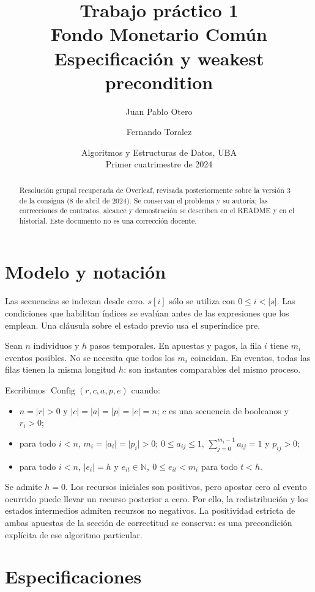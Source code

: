 \documentclass[11pt,a4paper]{article}
\title{Trabajo práctico 1\\Fondo Monetario Común\\Especificación y weakest precondition}
\author{Juan Pablo Otero \and Fernando Toralez}
\date{Algoritmos y Estructuras de Datos, UBA\\Primer cuatrimestre de 2024}
\newcommand{\N}{\mathbb N}
\newcommand{\len}[1]{\lvert #1\rvert}
\begin{document}
\maketitle
\begin{abstract}
Resolución grupal recuperada de Overleaf, revisada posteriormente sobre la
versión 3 de la consigna (8 de abril de 2024). Se conservan el problema y su
autoría; las correcciones de contratos, alcance y demostración se describen
en el README y en el historial. Este documento no es una corrección docente.
\end{abstract}
\tableofcontents
\clearpage
\section{Modelo y notación}
Las secuencias se indexan desde cero. $s[i]$ sólo se utiliza con
$0\leq i<\len{s}$. Las condiciones que habilitan índices se evalúan antes
de las expresiones que los emplean. Una cláusula sobre el estado previo
usa el superíndice $\mathrm{pre}$.

Sean $n$ individuos y $h$ pasos temporales. En apuestas y pagos, la fila
$i$ tiene $m_i$ eventos posibles. No se necesita que todos los $m_i$
coincidan. En eventos, todas las filas tienen la misma longitud $h$:
son instantes comparables del mismo proceso.

Escribimos $\operatorname{Config}(r,c,a,p,e)$ cuando:
\begin{itemize}
\item $n=\len{r}>0$ y $\len{c}=\len{a}=\len{p}=\len{e}=n$;
      $c$ es una secuencia de booleanos y $r_i>0$;
\item para todo $i<n$, $m_i=\len{a_i}=\len{p_i}>0$;
      $0\leq a_{ij}\leq1$, $\sum_{j=0}^{m_i-1}a_{ij}=1$ y $p_{ij}>0$;
\item para todo $i<n$, $\len{e_i}=h$ y
      $e_{it}\in\N,\ 0\leq e_{it}<m_i$ para todo $t<h$.
\end{itemize}
Se admite $h=0$. Los recursos iniciales son positivos, pero apostar cero
al evento ocurrido puede llevar un recurso posterior a cero. Por ello,
la redistribución y los estados intermedios admiten recursos no negativos.
La positividad estricta de ambas apuestas de la sección de correctitud
se conserva: es una precondición explícita de ese algoritmo particular.

\section{Especificaciones}
\end{document}
